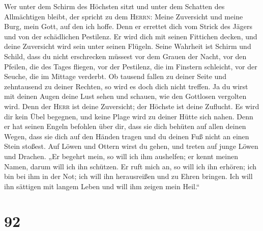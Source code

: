  Wer unter dem Schirm des Höchsten sitzt und unter dem
Schatten des Allmächtigen bleibt,  der spricht zu dem
\textsc{Herrn}: Meine Zuversicht und meine Burg, mein Gott, auf den ich
hoffe.  Denn er errettet dich vom Strick des Jägers und
von der schädlichen Pestilenz.  Er wird dich mit seinen
Fittichen decken, und deine Zuversicht wird sein unter seinen Flügeln.
Seine Wahrheit ist Schirm und Schild,  dass du nicht
erschrecken müssest vor dem Grauen der Nacht, vor den Pfeilen, die des
Tages fliegen,  vor der Pestilenz, die im Finstern
schleicht, vor der Seuche, die im Mittage verderbt.  Ob
tausend fallen zu deiner Seite und zehntausend zu deiner Rechten, so
wird es doch dich nicht treffen.  Ja du wirst mit deinen
Augen deine Lust sehen und schauen, wie den Gottlosen vergolten wird.
 Denn der \textsc{Herr} ist deine Zuversicht; der Höchste
ist deine Zuflucht.  Es wird dir kein Übel begegnen, und
keine Plage wird zu deiner Hütte sich nahen.  Denn er hat
seinen Engeln befohlen über dir, dass sie dich behüten auf allen deinen
Wegen,  dass sie dich auf den Händen tragen und du deinen
Fuß nicht an einen Stein stoßest.  Auf Löwen und Ottern
wirst du gehen, und treten auf junge Löwen und Drachen. 
„Er begehrt mein, so will ich ihm aushelfen; er kennt meinen Namen,
darum will ich ihn schützen.  Er ruft mich an, so will
ich ihn erhören; ich bin bei ihm in der Not; ich will ihn herausreißen
und zu Ehren bringen.  Ich will ihn sättigen mit langem
Leben und will ihm zeigen mein Heil.``

\hypertarget{section-91}{%
\section{92}\label{section-91}}

